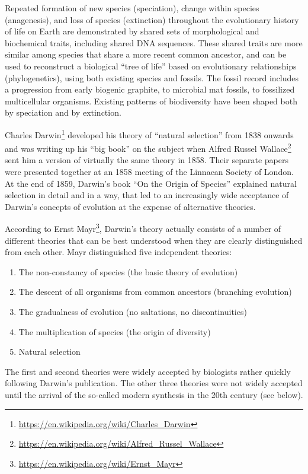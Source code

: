\documentclass[]{book}
\providecommand{\tightlist}{%
  \setlength{\itemsep}{0pt}\setlength{\parskip}{0pt}}
\let\rmarkdownfootnote\footnote%
\def\footnote{\protect\rmarkdownfootnote}
\renewcommand{\href}[2]{#2\footnote{\url{#1}}}
\theoremstyle{definition}
\theoremstyle{definition}
\theoremstyle{definition}
\theoremstyle{remark}
\begin{document}
Repeated formation of new species (speciation), change within species
(anagenesis), and loss of species (extinction) throughout the
evolutionary history of life on Earth are demonstrated by shared sets of
morphological and biochemical traits, including shared DNA sequences.
These shared traits are more similar among species that share a more
recent common ancestor, and can be used to reconstruct a biological
``tree of life'' based on evolutionary relationships (phylogenetics),
using both existing species and fossils. The fossil record includes a
progression from early biogenic graphite, to microbial mat fossils, to
fossilized multicellular organisms. Existing patterns of biodiversity
have been shaped both by speciation and by extinction.

\href{https://en.wikipedia.org/wiki/Charles_Darwin}{Charles Darwin}
developed his theory of ``natural selection'' from 1838 onwards and was
writing up his ``big book'' on the subject when
\href{https://en.wikipedia.org/wiki/Alfred_Russel_Wallace}{Alfred Russel
Wallace} sent him a version of virtually the same theory in 1858. Their
separate papers were presented together at an 1858 meeting of the
Linnaean Society of London. At the end of 1859, Darwin's book ``On the
Origin of Species'' explained natural selection in detail and in a way,
that led to an increasingly wide acceptance of Darwin's concepts of
evolution at the expense of alternative theories.

According to \href{https://en.wikipedia.org/wiki/Ernst_Mayr}{Ernst
Mayr}, Darwin's theory actually consists of a number of different
theories that can be best understood when they are clearly distinguished
from each other. Mayr distinguished five independent theories:

\begin{enumerate}
\def\labelenumi{\arabic{enumi}.}
\tightlist
\item
  The non-constancy of species (the basic theory of evolution)
\item
  The descent of all organisms from common ancestors (branching
  evolution)
\item
  The gradualness of evolution (no saltations, no discontinuities)
\item
  The multiplication of species (the origin of diversity)
\item
  Natural selection
\end{enumerate}

The first and second theories were widely accepted by biologists rather
quickly following Darwin's publication. The other three theories were
not widely accepted until the arrival of the so-called modern synthesis
in the 20th century (see below).
\end{document}
